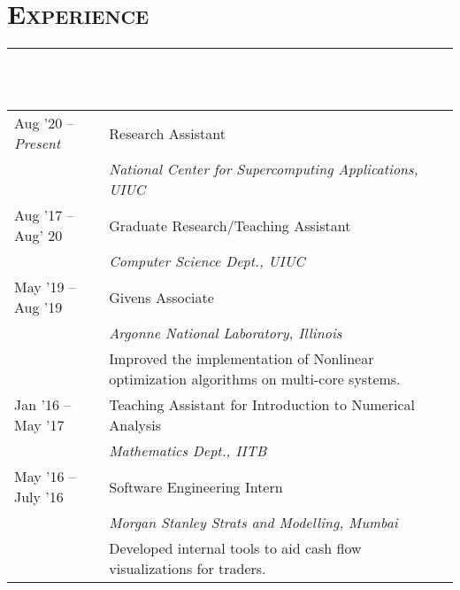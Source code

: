 \documentclass[letterpaper, 13pt]{article}
\begin{document}
\section*{\Large\textsc{Experience}}
\vspace{-4ex}
\rule{\textwidth}{0.1ex}\\
\vspace{1ex}\\
\begin{tabular}{p{} p{}}
Aug '20 -- \textit{Present} &   Research Assistant\\
                            &   \textit{\small National Center for
                            Supercomputing Applications, UIUC}\vspace{1ex}\\
Aug '17 -- Aug' 20          &   Graduate Research/Teaching Assistant\\
                            &   \textit{\small Computer Science Dept., UIUC}\vspace{1ex}\\
May '19 -- Aug '19          &   Givens Associate\\
                            &   \textit{\small Argonne National Laboratory, Illinois}\\
                            & {\small Improved the implementation of Nonlinear optimization algorithms on multi-core systems.}\vspace{1ex}\\
Jan '16 -- May '17          &   Teaching Assistant for Introduction to Numerical Analysis\\
                            &   \textit{\small Mathematics Dept., IITB}\vspace{1ex}\\
May '16 -- July '16         &   Software Engineering Intern\\
                            &   \textit{\small Morgan Stanley Strats and Modelling, Mumbai}\\
                            & Developed internal tools to aid cash flow visualizations for traders.
\end{tabular}




\nocite{*}
\printbibliography[title={\Large\textsc{Publications}\vspace*{-2ex}\\\rule{\textwidth}{0.1ex}},filter=papers]
\printbibliography[title={\Large\textsc{Talks}\vspace*{-2ex}\\\rule{\textwidth}{0.1ex}},type=inproceedings, resetnumbers=true]
\end{document}
